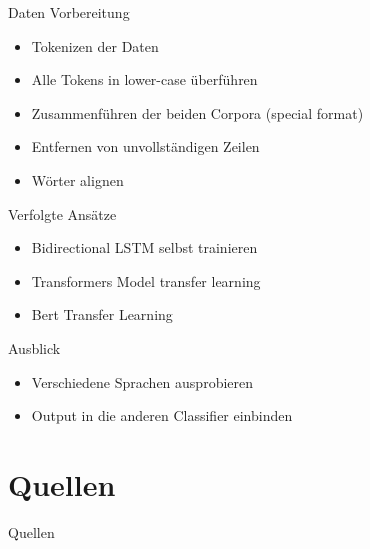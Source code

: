 \documentclass[xcolor=table]{beamer}
\begin{document}
\begin{frame}[t]{Daten Vorbereitung}\vspace{10pt}
\begin{itemize}
\item Tokenizen der Daten
\item Alle Tokens in lower-case überführen
\item Zusammenführen der beiden Corpora (special format)
\item Entfernen von unvollständigen Zeilen
\item Wörter alignen
\end{itemize}
\end{frame}

\begin{frame}[t]{Verfolgte Ansätze}\vspace{10pt}
\begin{itemize}
\item Bidirectional LSTM selbst trainieren
\item Transformers Model transfer learning
\item Bert Transfer Learning
\end{itemize}
\end{frame}

\begin{frame}[t]{Ausblick}\vspace{10pt}
\begin{itemize}
\item Verschiedene Sprachen ausprobieren
\item Output in die anderen Classifier einbinden
\end{itemize}
\end{frame}

\section{Quellen}
\begin{frame}{Quellen}
\printbibliography
\end{frame}
\end{document}
